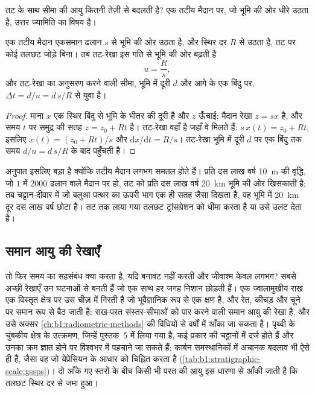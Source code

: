 तट के साथ सीमा की आयु कितनी तेज़ी से बदलती है? एक तटीय मैदान पर, जो भूमि की ओर धीरे उठता है, उत्तर ज्यामिति का विषय है।

\begin{proposition}[ट्रांसग्रेशन की गति]\label{prop:b1:stratigraphic-scale:transgression}
एक तटीय मैदान एकसमान ढलान $s$ से भूमि की ओर उठता है, और  स्थिर दर $R$ से उठता है, तट पर कोई तलछट जोड़े बिना। तब तट-रेखा इस गति से भूमि की ओर बढ़ती है
\[
  u = \frac{R}{s},
\]
और तट-रेखा का अनुसरण करने वाली सीमा, भूमि में दूरी $d$ और आगे के एक बिंदु पर, $\Delta t = d/u = d\,s/R$ से युवा है।
\end{proposition}

\begin{proof}
माना $x$ एक स्थिर बिंदु से भूमि के भीतर की दूरी है और $z$ ऊँचाई; मैदान रेखा $z = s x$ है, और समय $t$ पर समुद्र की सतह $z = z_0 + R t$ है। तट-रेखा वहाँ है जहाँ वे मिलते हैं: $s\,x(t) = z_0 + R t$, इसलिए $x(t) = (z_0 + R t)/s$ और $\mathrm dx/\mathrm dt = R/s$। तट-रेखा भूमि में दूरी $d$ पर एक बिंदु तक समय $d/u = d\,s/R$ के बाद पहुँचती है।
\end{proof}

अनुपात इसलिए बड़ा है क्योंकि तटीय मैदान लगभग समतल होते हैं। प्रति दस लाख वर्ष \qty{10}{m} की वृद्धि, जो $1$ में $2000$ ढलान वाले मैदान पर हो, तट को प्रति दस लाख वर्ष \qty{20}{km} भूमि की ओर खिसकाती है; तब चट्टान-दीवार में जो बलुआ पत्थर का ऊपरी भाग एक ही सतह जैसा दिखता है, वह भूमि में \qty{20}{km} दूर दस लाख वर्ष छोटा है। तट तक लाया गया तलछट ट्रांसग्रेशन को धीमा करता है या उसे उलट देता है।

\subsection*{समान आयु की रेखाएँ}

तो फिर समय का सहसंबंध क्या करता है, यदि बनावट नहीं करती और जीवाश्म केवल लगभग? सबसे अच्छी रेखाएँ उन घटनाओं से बनती हैं जो एक साथ हर जगह निशान छोड़ती हैं। एक ज्वालामुखीय राख एक विस्तृत क्षेत्र पर उस चीज़ में गिरती है जो भूवैज्ञानिक रूप से एक क्षण है, और रेत, कीचड़ और चूने पर समान रूप से बैठ जाती है: राख-परत संस्तर-सीमाओं को पार करने वाली समान आयु की रेखा है, और उसे अक्सर \cref{ch:b1:radiometric-methods} की विधियों से वर्षों में आँका जा सकता है। पृथ्वी के चुंबकीय क्षेत्र के उत्क्रमण, जिन्हें पुस्तक~5 में लिया गया है, कई प्रकार की चट्टानों में दर्ज होते हैं और उनका क्रम ज्ञात होने पर विश्वभर में पहचाने जा सकते हैं; कार्बन समस्थानिकों में अचानक बदलाव भी ऐसे ही हैं, जैसा वह जो येप्रेसियन के आधार को चिह्नित करता है (\cref{tab:b1:stratigraphic-scale:gssps})। दो आँके गए स्तरों के बीच किसी भी परत की आयु इस धारणा से आँकी जाती है कि तलछट स्थिर दर से जमा हुआ।

